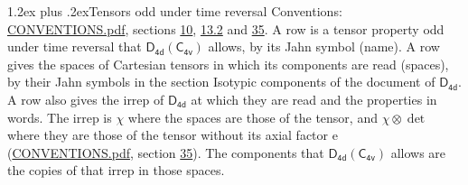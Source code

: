 \documentclass[10pt,a4paper]{article}
\makeatletter
\renewcommand\section{\@startsection{section}{1}{\z@}{-3ex plus -1ex minus -.2ex}%
  {1.2ex plus .2ex}{\normalfont\large\sffamily\bfseries\color{parttitle}}}
\numberwithin{equation}{section}
\newcommand{\grp}[1]{\mathsf{#1}}
\newcommand{\irrprod}{\otimes}
\makeatother
\begin{document}
\section{Tensors odd under time reversal}\label{s:time_odd}
Conventions: \href{../../CONVENTIONS.pdf}{CONVENTIONS.pdf}, sections \href{../../../rotation/CONVENTIONS.pdf\#conv.10}{10}, \href{../../../rotation/CONVENTIONS.pdf\#conv.13.2}{13.2} and \href{../../CONVENTIONS.pdf\#conv.35}{35}.
\leavevmode\label{n:head.name.property}A row is a tensor property odd under time reversal that $\grp{D_{4d}}(\grp{C_{4v}})$ allows, by its Jahn symbol (name). \label{n:head.spaces}A row gives the spaces of Cartesian tensors in which its components are read (spaces), by their Jahn symbols in the section Isotypic components of the document of \href{../../../rotation/data/pdf/D4d.pdf}{$\grp{D_{4d}}$}. \label{n:head.properties}A row also gives the irrep of $\grp{D_{4d}}$ at which they are read and the properties in words. The irrep is $\chi$ where the spaces are those of the tensor, and $\chi \irrprod \det$ where they are those of the tensor without its axial factor e (\href{../../CONVENTIONS.pdf}{CONVENTIONS.pdf}, section \href{../../CONVENTIONS.pdf\#conv.35}{35}). The components that $\grp{D_{4d}}(\grp{C_{4v}})$ allows are the copies of that irrep in those spaces.
\end{document}
